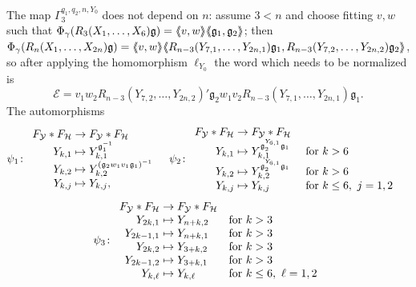 \documentclass[a4paper,11pt]{amsart}
\begin{document}
The map $\Gamma_3^{q_1,q_2,n,Y_0}$ does not depend on $n$: assume
$3<n$ and choose fitting $v,w$ such that
$\Phi_\gamma(R_3(X_1,\ldots,X_6)\mathfrak g)=\langle\negthickspace\langle v,w\rangle\negthickspace\rangle\langle\negthickspace\langle\mathfrak
g_1,\mathfrak g_2\rangle\negthickspace\rangle$; then
$\Phi_\gamma(R_n(X_1,\ldots,X_{2n}) \mathfrak g)=\langle\negthickspace\langle v,w\rangle\negthickspace\rangle
\langle\negthickspace\langle R_{n-3}(Y_{7,1},\ldots,Y_{2n,1})\mathfrak g_1,
R_{n-3}(Y_{7,2},\ldots,Y_{2n,2})\mathfrak g_2\rangle\negthickspace\rangle$, so after
applying the homomorphism $\ell_{Y_0}$ the word which needs to be
normalized is 
\[\mathcal{E}=v_1w_2R_{n-3}(Y_{7,2},\ldots,Y_{2n,2})'\mathfrak g_2w_1v_2R_
{n-3}(Y_{7,1},\ldots,Y_{2n,1}) \mathfrak g_1.\] The
automorphisms
\begin{align*}
  \psi_1\colon&\begin{array}{r@{\;}l}
                 F_{\mathcal{Y}}*F_{\mathcal{H}} &\to F_{\mathcal{Y}}*F_
                 {\mathcal H}\\
                 Y_{k,1} &\mapsto Y_{k,1}^{\mathfrak g_1^{-1}}\\
                 Y_{k,2} &\mapsto Y_{k,2}^{(\mathfrak g_2w_1v_1\mathfrak g_1)^{-1}}\\
                 Y_{k,j} &\mapsto Y_{k,j},
              \end{array} &
  \psi_2\colon&\begin{array}{r@{\;}ll}
                 F_{\mathcal{Y}}*F_{\mathcal{H}} &\to F_{\mathcal{Y}}*F_
                 {\mathcal{H}}\\
                 Y_{k,1} &\mapsto Y_{k,1}^{\mathfrak g_2^{Y_{6,1}}\mathfrak g_1}&\text{ for
                 } k> 6\\
                 Y_{k,2} &\mapsto Y_{k,2}^{\mathfrak g_2^{Y_{6,1}}\mathfrak g_1}&\text{ for
                 } k> 6\\
                 Y_{k,j} &\mapsto Y_{k,j} &\text{ for } k\leq 6,\ j=1,2
               \end{array}
\end{align*}
\[
 \psi_3\colon \begin{array}{r@{\;}l@{\quad}l}
                 F_{\mathcal{Y}}*F_{\mathcal{H}} &\to F_{\mathcal{Y}}*F_
                 {\mathcal H}\\
                 Y_{2k,1} &\mapsto Y_{n+k,2}&\text{for } k>3\\
                 Y_{2k-1,1} &\mapsto Y_{n+k,1}&\text{for } k>3\\
                 Y_{2k,2} &\mapsto Y_{3+k,2}&\text{for } k>3\\
                 Y_{2k-1,2} &\mapsto Y_{3+k,1}&\text{for } k>3\\
                 Y_{k,\ell} &\mapsto Y_{k,\ell}&\text{for } k\leq6,\ \ell=1,2\\
              \end{array} 
\]
\end{document}
